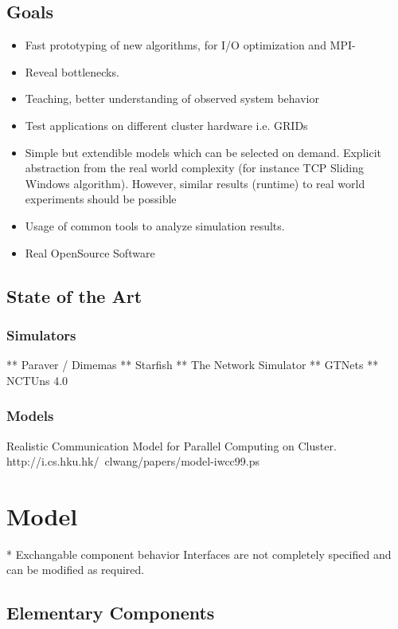 \documentclass[
     11pt,         %
     a4paper,      %
     BCOR10mm,     %
     DIV14,        %
     liststotoc,   %
     bibtotoc,     %
     idxtotoc,     %
     parskip       %
     ]{scrreprt}   %
\begin{document}
\section{Goals}
\begin{itemize}
\item Fast prototyping of new algorithms, for I/O optimization and MPI-
\item Reveal bottlenecks.
\item Teaching, better understanding of observed system behavior
\item Test applications on different cluster hardware i.e. GRIDs
\item Simple but extendible models which can be selected on demand.
   Explicit abstraction from the real world complexity (for instance TCP Sliding Windows algorithm).
   However, similar results (runtime) to real world experiments should be possible
\item Usage of common tools to analyze simulation results.
\item Real OpenSource Software
\end{itemize}

\section{State of the Art}
\subsection{Simulators}
** Paraver / Dimemas
** Starfish
** The Network Simulator
** GTNets
** NCTUns 4.0


\subsection{Models}
Realistic Communication Model for Parallel Computing on Cluster.
http://i.cs.hku.hk/~clwang/papers/model-iwcc99.ps



\chapter{Model}

* Exchangable component behavior
  Interfaces are not completely specified and can be modified as required.

\section{Elementary Components}
\end{document}

